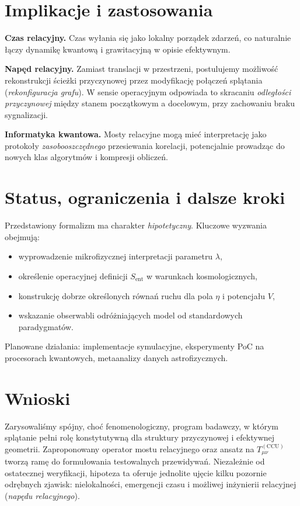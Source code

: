 \documentclass[11pt,a4paper]{article}
\begin{document}
\section{Implikacje i zastosowania}
\textbf{Czas relacyjny.} Czas wyłania się jako lokalny porządek zdarzeń, co naturalnie łączy dynamikę kwantową i grawitacyjną w opisie efektywnym.

\textbf{Napęd relacyjny.} Zamiast translacji w przestrzeni, postulujemy możliwość rekonstrukcji ścieżki przyczynowej przez modyfikację połączeń splątania (\emph{rekonfiguracja grafu}). W sensie operacyjnym odpowiada to skracaniu \emph{odległości przyczynowej} między stanem początkowym a docelowym, przy zachowaniu braku sygnalizacji.

\textbf{Informatyka kwantowa.} Mosty relacyjne mogą mieć interpretację jako protokoły \emph{zasobooszczędnego} przesiewania korelacji, potencjalnie prowadząc do nowych klas algorytmów i kompresji obliczeń.

\section{Status, ograniczenia i dalsze kroki}
Przedstawiony formalizm ma charakter \emph{hipotetyczny}. Kluczowe wyzwania obejmują:
\begin{itemize}[nosep]
\item wyprowadzenie mikrofizycznej interpretacji parametru $\lambda$,
\item określenie operacyjnej definicji $S_{\mathrm{ent}}$ w warunkach kosmologicznych,
\item konstrukcję dobrze określonych równań ruchu dla pola $\eta$ i potencjału $V$,
\item wskazanie obserwabli odróżniających model od standardowych paradygmatów.
\end{itemize}
Planowane działania: implementacje symulacyjne, eksperymenty PoC na procesorach kwantowych, metaanalizy danych astrofizycznych.

\section{Wnioski}
Zarysowaliśmy spójny, choć fenomenologiczny, program badawczy, w którym splątanie pełni rolę konstytutywną dla struktury przyczynowej i efektywnej geometrii. Zaproponowany operator mostu relacyjnego oraz ansatz na $T^{\mathrm{(CCU)}}_{\mu\nu}$ tworzą ramę do formułowania testowalnych przewidywań. Niezależnie od ostatecznej weryfikacji, hipoteza ta oferuje jednolite ujęcie kilku pozornie odrębnych zjawisk: nielokalności, emergencji czasu i możliwej inżynierii relacyjnej (\emph{napędu relacyjnego}).
\end{document}
